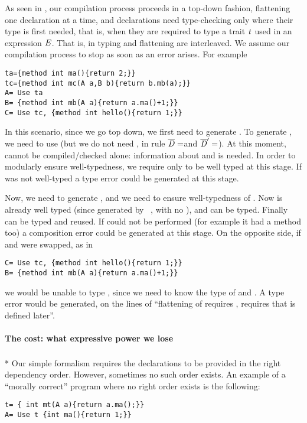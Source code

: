 As seen in , our compilation process
proceeds in a top-down fashion, flattening one declaration at a time,
and declarations need type-checking
only where their type is first needed,
that is, when they are required to type a trait $\mathit{t}$ used in an expression $\mathit{E}$.
That is, in \name typing and flattening are interleaved. We assume our compilation process to stop as soon as 
an error arises. 
For example
\saveSpace\begin{lstlisting}
ta={method int ma(){return 2;}}
tc={method int mc(A a,B b){return b.mb(a);}}
A= Use ta
B= {method int mb(A a){return a.ma()+1;}}
C= Use tc, {method int hello(){return 1;}}
\end{lstlisting}\saveSpace
In this scenario, since we go top down, we first need to generate \Q@A@.
To generate \Q@A@, we need to use \Q@ta@ (but we do not need
\Q@tc@, in rule  $\overline{\mathit{D}}=$\Q@ta@ and $\overline{\mathit{D}}'=$\Q@tc@).
At this moment, \Q@tc@ cannot be compiled/checked alone:
information about \Q@A@ and \Q@B@ is needed.
In order to modularly ensure well-typedness,
we require only \Q@ta@ to be well typed at this stage. If \Q@ta@ was not well-typed
a type error could be generated at this stage.

Now, we need to generate \Q@C@, and we need to ensure well-typedness of \Q@tc@.
Now \Q@A@ is already well typed (since generated by \use\ \Q@ta@, with no \mL),
and \Q@B@ can be typed. Finally \Q@tc@ can be typed and reused.
If  could not be performed (for example it \Q@tc@ had a method \Q@hello@ too)
a composition error could be generated at this stage.
On the opposite side, if \Q@B@ and \Q@C@ were swapped, as in
\saveSpace\begin{lstlisting}
C= Use tc, {method int hello(){return 1;}}
B= {method int mb(A a){return a.ma()+1;}}
\end{lstlisting}\saveSpace
\noindent
we would be unable to type \Q@tc@, since we need to know the type of \Q@A@ and \Q@B@.
A type error would be generated, on the lines of ``flattening of \Q@C@
requires \Q@tc@, \Q@tc@ requires \Q@B@ that is defined later''.


\paragraph{The cost: what expressive power we lose}${}_{}$\\*
Our simple formalism requires the declarations to be provided in the right dependency order. However, sometimes no such order exists.
An example of a ``morally correct'' program where no right order exists is the following:
\saveSpace\begin{lstlisting}
t= { int mt(A a){return a.ma();}}
A= Use t {int ma(){return 1;}}
\end{lstlisting}\saveSpace

